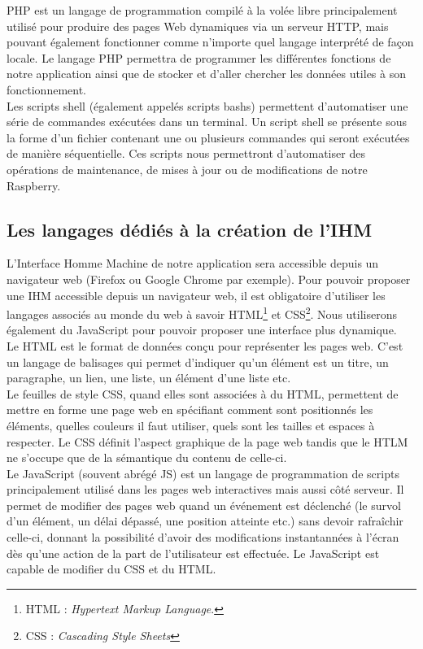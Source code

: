 PHP est un langage de programmation compilé à la volée libre principalement utilisé pour produire des pages Web dynamiques via un serveur HTTP, mais pouvant également fonctionner comme n'importe quel langage interprété de façon locale. Le langage PHP permettra de programmer les différentes fonctions de notre application ainsi que de stocker et d'aller chercher les données utiles à son fonctionnement.\\

Les scripts shell (également appelés scripts bashs) permettent d'automatiser une série de commandes exécutées dans un terminal. Un script shell se présente sous la forme d'un fichier contenant une ou plusieurs commandes qui seront exécutées de manière séquentielle. Ces scripts nous permettront d'automatiser des opérations de maintenance, de mises à jour ou de modifications de notre Raspberry.

\subsection{Les langages dédiés à la création de l'IHM}
L'Interface Homme Machine de notre application sera accessible depuis un navigateur web (Firefox ou Google Chrome par exemple). Pour pouvoir proposer une IHM accessible depuis un navigateur web, il est obligatoire d'utiliser les langages associés au monde du web à savoir HTML\footnote{HTML : \textit{Hypertext Markup Language}.} et CSS\footnote{CSS : \textit{Cascading Style Sheets}}. Nous utiliserons également du JavaScript pour pouvoir proposer une interface plus dynamique.\\

Le HTML est le format de données conçu pour représenter les pages web. C'est un langage de balisages qui permet d'indiquer qu'un élément est un titre, un paragraphe, un lien, une liste, un élément d'une liste etc.\\

Le feuilles de style CSS, quand elles sont associées à du HTML, permettent de mettre en forme une page web en spécifiant comment sont positionnés les éléments, quelles couleurs il faut utiliser, quels sont les tailles et espaces à respecter. Le CSS définit l'aspect graphique de la page web tandis que le HTLM ne s'occupe que de la sémantique du contenu de celle-ci.\\

Le JavaScript (souvent abrégé JS) est un langage de programmation de scripts principalement utilisé dans les pages web interactives mais aussi côté serveur. Il permet de modifier des pages web quand un événement est déclenché (le survol d'un élément, un délai dépassé, une position atteinte etc.) sans devoir rafraîchir celle-ci, donnant la possibilité d'avoir des modifications instantannées à l'écran dès qu'une action de la part de l'utilisateur est effectuée. Le JavaScript est capable de modifier du CSS et du HTML.

